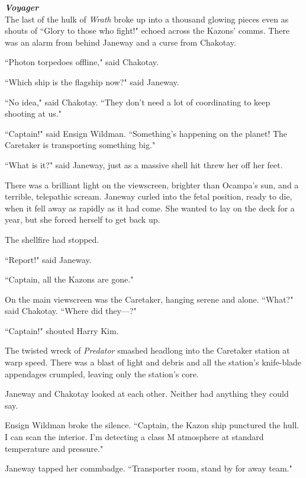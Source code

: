 \documentclass[twoside,letterpaper,12pt]{memoir}
\begin{document}
\noindent\textit{\textbf{Voyager}}\\

The last of the hulk of \textit{Wrath} broke up into a thousand glowing pieces even as shouts of ``Glory to those who fight!" echoed across the Kazons' comms. There was an alarm from behind Janeway and a curse from Chakotay. 

``Photon torpedoes offline," said Chakotay. 

``Which ship is the flagship now?" said Janeway. 

``No idea," said Chakotay. ``They don't need a lot of coordinating to keep shooting at us." 

``Captain!" said Ensign Wildman. ``Something's happening on the planet! The Caretaker is transporting something big." 

``What is it?" said Janeway, just as a massive shell hit threw her off her feet. 

There was a brilliant light on the viewscreen, brighter than Ocampa's sun, and a terrible, telepathic scream. Janeway curled into the fetal position, ready to die, when it fell away as rapidly as it had come. She wanted to lay on the deck for a year, but she forced herself to get back up. 

The shellfire had stopped. 

``Report!" said Janeway. 

``Captain, all the Kazons are gone." 

On the main viewscreen was the Caretaker, hanging serene and alone. ``What?" said Chakotay. ``Where did they---?" 

``Captain!" shouted Harry Kim. 

The twisted wreck of \textit{Predator} smashed headlong into the Caretaker station at warp speed. There was a blast of light and debris and all the station's knife-blade appendages crumpled, leaving only the station's core. 

Janeway and Chakotay looked at each other. Neither had anything they could say. 

Ensign Wildman broke the silence. ``Captain, the Kazon ship punctured the hull. I can scan the interior. I'm detecting a class M atmosphere at standard temperature and pressure." 

Janeway tapped her commbadge. ``Transporter room, stand by for away team."
\end{document}
